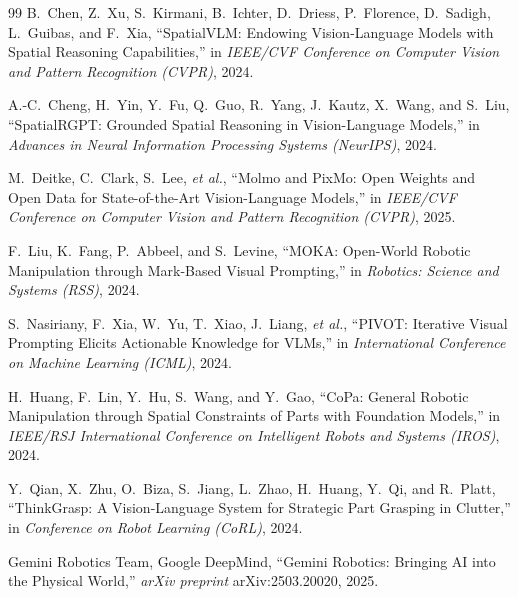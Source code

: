 \documentclass[11pt,a4paper]{article}
\begin{document}
\begin{thebibliography}{99}
B.~Chen, Z.~Xu, S.~Kirmani, B.~Ichter, D.~Driess, P.~Florence, D.~Sadigh, L.~Guibas, and F.~Xia,
``SpatialVLM: Endowing Vision-Language Models with Spatial Reasoning Capabilities,''
in \emph{IEEE/CVF Conference on Computer Vision and Pattern Recognition (CVPR)}, 2024.

A.-C.~Cheng, H.~Yin, Y.~Fu, Q.~Guo, R.~Yang, J.~Kautz, X.~Wang, and S.~Liu,
``SpatialRGPT: Grounded Spatial Reasoning in Vision-Language Models,''
in \emph{Advances in Neural Information Processing Systems (NeurIPS)}, 2024.

M.~Deitke, C.~Clark, S.~Lee, \emph{et al.},
``Molmo and PixMo: Open Weights and Open Data for State-of-the-Art Vision-Language Models,''
in \emph{IEEE/CVF Conference on Computer Vision and Pattern Recognition (CVPR)}, 2025.

F.~Liu, K.~Fang, P.~Abbeel, and S.~Levine,
``MOKA: Open-World Robotic Manipulation through Mark-Based Visual Prompting,''
in \emph{Robotics: Science and Systems (RSS)}, 2024.

S.~Nasiriany, F.~Xia, W.~Yu, T.~Xiao, J.~Liang, \emph{et al.},
``PIVOT: Iterative Visual Prompting Elicits Actionable Knowledge for VLMs,''
in \emph{International Conference on Machine Learning (ICML)}, 2024.

H.~Huang, F.~Lin, Y.~Hu, S.~Wang, and Y.~Gao,
``CoPa: General Robotic Manipulation through Spatial Constraints of Parts with Foundation Models,''
in \emph{IEEE/RSJ International Conference on Intelligent Robots and Systems (IROS)}, 2024.

Y.~Qian, X.~Zhu, O.~Biza, S.~Jiang, L.~Zhao, H.~Huang, Y.~Qi, and R.~Platt,
``ThinkGrasp: A Vision-Language System for Strategic Part Grasping in Clutter,''
in \emph{Conference on Robot Learning (CoRL)}, 2024.

Gemini Robotics Team, Google DeepMind,
``Gemini Robotics: Bringing AI into the Physical World,''
\emph{arXiv preprint} arXiv:2503.20020, 2025.

\end{thebibliography}
\end{document}
